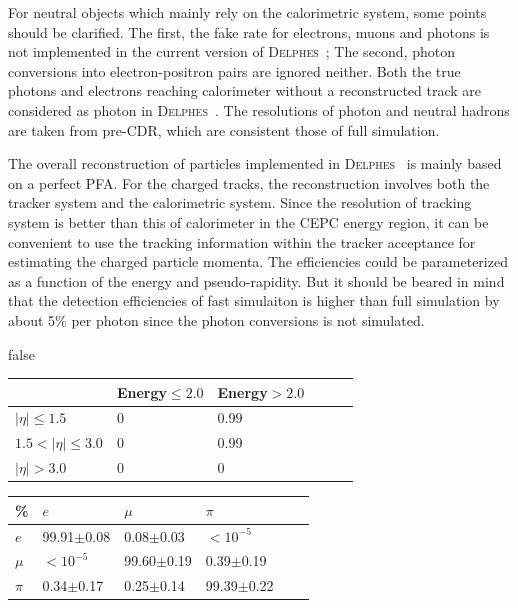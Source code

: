\documentclass[a4paper,10pt,twoside]{cpc-hepnp}
\begin{document}
\begin{multicols}{2}
For neutral objects which mainly rely on the calorimetric system, some points should be clarified.
The first, the fake rate for electrons, muons and photons is not implemented in the current version of {\textsc{Delphes}~};
The second, photon conversions into electron-positron pairs are ignored neither.
Both the true photons and electrons reaching calorimeter without a reconstructed track are considered as photon in {\textsc{Delphes}~}.
The resolutions of photon and neutral hadrons are taken from pre-CDR, which are consistent those of full simulation.

The overall reconstruction of particles implemented in {\textsc{Delphes}~} is mainly based on a perfect PFA.
For the charged tracks, the reconstruction involves both the tracker system and the calorimetric system.
Since the resolution of tracking system is better than this of calorimeter in the CEPC energy region,
it can be convenient to use the tracking information within the tracker acceptance for estimating the charged particle momenta.
The efficiencies could be parameterized as a function of the energy and pseudo-rapidity. But it should be beared in mind
that the detection efficiencies of fast simulaiton is higher than full simulation by about 5\% per photon
since the photon conversions is not simulated.   


\if false
\begin{center}
\begin{tabular}{@{}*{3}{ll}}
\hline \hline
		& Energy$\le2.0$ & Energy$>2.0$ \\ \hline\hline
$|\eta|\le1.5$  & 0 		     & 0.99 \\
$1.5<|\eta|\le3.0$    & 0 	     & 0.99 \\
$|\eta|>3.0$  & 0 		     & 0      \\
\hline \hline
\end{tabular}
\end{center}

\begin{center}
\begin{tabular}{@{}*{3}{ll}}
\hline \hline
\%	    & $e$ & $\mu$ & $\pi$ \\ \hline\hline
$e$      & 99.91$\pm$0.08  & 0.08$\pm$0.03   & $<10^{-5}$ \\
$\mu$  & $<10^{-5}$ 	      & 99.60$\pm$0.19 & 0.39$\pm$0.19 \\
$\pi$    & 0.34$\pm$0.17    & 0.25$\pm$0.14   & 99.39$\pm$0.22  \\
\hline \hline
\end{tabular}
\end{center}
\fi


\end{multicols}
\end{document}
